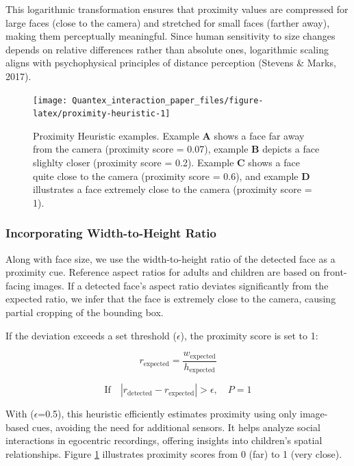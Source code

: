 \documentclass[
  man,floatsintext]{apa6}
\begin{document}
This logarithmic transformation ensures that proximity values are compressed for large faces (close to the camera) and stretched for small faces (farther away), making them perceptually meaningful. Since human sensitivity to size changes depends on relative differences rather than absolute ones, logarithmic scaling aligns with psychophysical principles of distance perception (Stevens \& Marks, 2017).

\begin{figure}

{\centering \texttt{[image: Quantex\_interaction\_paper\_files/figure-latex/proximity-heuristic-1]} 

}

\caption{Proximity Heuristic examples. Example \textbf{A} shows a face far away from the camera (proximity score = 0.07), example \textbf{B} depicts a face slighlty closer (proximity score = 0.2). Example \textbf{C} shows a face quite close to the camera (proximity score = 0.6), and example \textbf{D} illustrates a face extremely close to the camera (proximity score = 1).}\label{fig:proximity-heuristic}
\end{figure}

\subsubsection{Incorporating Width-to-Height Ratio}\label{incorporating-width-to-height-ratio-1}

Along with face size, we use the width-to-height ratio of the detected face as a proximity cue. Reference aspect ratios for adults and children are based on front-facing images. If a detected face's aspect ratio deviates significantly from the expected ratio, we infer that the face is extremely close to the camera, causing partial cropping of the bounding box.

If the deviation exceeds a set threshold (\(\epsilon\)), the proximity score is set to 1:

\[
r_{\text{expected}} = \frac{w_{\text{expected}}}{h_{\text{expected}}}
\]

\[
\text{If} \quad |r_{\text{detected}} - r_{\text{expected}}| > \epsilon, \quad P = 1
\]

With (\(\epsilon\)=0.5), this heuristic efficiently estimates proximity using only image-based cues, avoiding the need for additional sensors. It helps analyze social interactions in egocentric recordings, offering insights into children's spatial relationships. Figure \ref{fig:proximity-heuristic} illustrates proximity scores from 0 (far) to 1 (very close).
\end{document}
